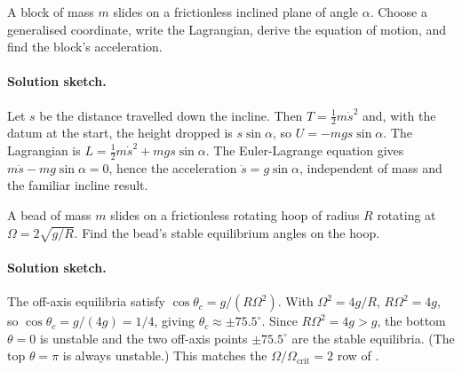 \begin{exercise}
A block of mass $m$ slides on a frictionless inclined plane of angle
$\alpha$. Choose a generalised coordinate, write the Lagrangian,
derive the equation of motion, and find the block's acceleration.

\paragraph{Solution sketch.} Let $s$ be the distance travelled down the
incline. Then $T = \tfrac12 m \dot{s}^2$ and, with the datum at the
start, the height dropped is $s\sin\alpha$, so $U = -mgs\sin\alpha$. The
Lagrangian is $L = \tfrac12 m\dot{s}^2 + mgs\sin\alpha$. The
Euler-Lagrange equation gives $m\ddot{s} - mg\sin\alpha = 0$, hence the
acceleration $\ddot{s} = g\sin\alpha$, independent of mass and the
familiar incline result.
\end{exercise}

\begin{exercise}
A bead of mass $m$ slides on a frictionless rotating hoop of radius
$R$ rotating at $\Omega = 2\sqrt{g/R}$. Find the bead's stable
equilibrium angles on the hoop.

\paragraph{Solution sketch.} The off-axis equilibria satisfy
$\cos\theta_c = g/(R\Omega^2)$. With $\Omega^2 = 4g/R$, $R\Omega^2 = 4g$,
so $\cos\theta_c = g/(4g) = 1/4$, giving $\theta_c \approx \pm 75.5^\circ$.
Since $R\Omega^2 = 4g > g$, the bottom $\theta = 0$ is unstable and the
two off-axis points $\pm 75.5^\circ$ are the stable equilibria. (The
top $\theta = \pi$ is always unstable.) This matches the
$\Omega/\Omega_\text{crit} = 2$ row of .
\end{exercise}

